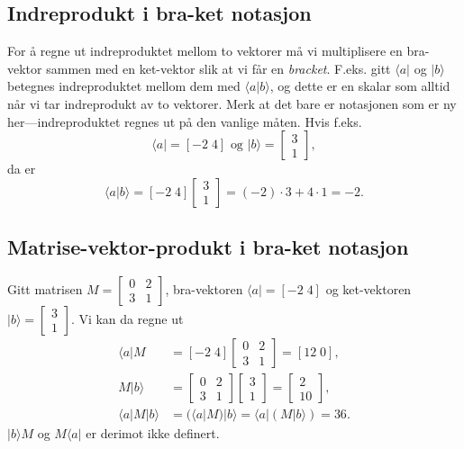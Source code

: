 \subsection{Indreprodukt i bra-ket notasjon}
For å regne ut indreproduktet mellom to vektorer må vi multiplisere en bra-vektor sammen med en ket-vektor slik at vi får en \emph{bracket}. F.eks. gitt $\langle a|$ og $|b\rangle$ betegnes indreproduktet mellom dem med $\langle a|b\rangle$, og dette er en skalar som alltid når vi tar indreprodukt av to vektorer. Merk at det bare er notasjonen som er ny her---indreproduktet regnes ut på den vanlige måten. Hvis f.eks.
\begin{displaymath}
	\langle a | =  [-2\; 4] \text{ og }  |b\rangle =  \left[\begin{array}{c} 3 \\ 1 \end{array}\right],
\end{displaymath}
da er
\begin{displaymath}
\langle a|b\rangle =  [-2\; 4]  \left[\begin{array}{c} 3 \\ 1 \end{array}\right] = (-2)\cdot3 +  4\cdot 1 = -2.
\end{displaymath}

\subsection{Matrise-vektor-produkt i bra-ket notasjon}
Gitt matrisen $M = \left[\begin{array}{cc} 0 & 2 \\ 3 & 1\end{array}\right]$, bra-vektoren $\langle a|=  [-2\; 4]$ og ket-vektoren  $|b\rangle =  \left[\begin{array}{c} 3 \\ 1 \end{array}\right]$. Vi kan da regne ut 
\begin{align*}
	\langle a|M &= [-2 \; 4] \left[\begin{array}{cc} 0 & 2 \\ 3 & 1\end{array}\right] = [12\; 0], \\
	M|b\rangle &=  \left[\begin{array}{cc} 0 & 2 \\ 3 & 1\end{array}\right]\left[\begin{array}{c} 3 \\ 1 \end{array}\right] = \left[\begin{array}{r}  2\\ 10  \end{array}\right], \\
	\langle a|M|b\rangle &= (\langle a|M)|b\rangle = \langle a|(M|b\rangle) =  36.
\end{align*}
$|b\rangle M$ og $M\langle a|$ er derimot ikke definert.